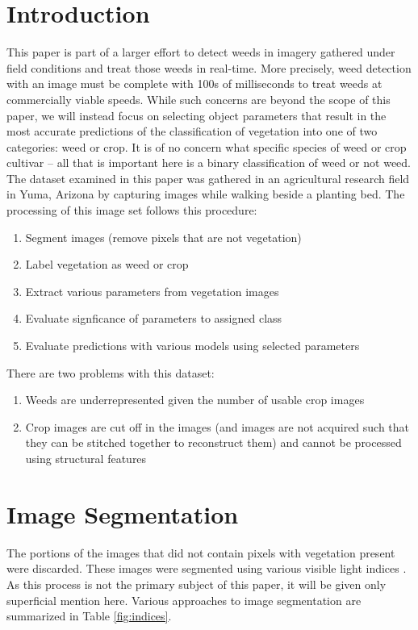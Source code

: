 \documentclass[letterpaper]{article}
\begin{document}
%
%

%
%
\section{Introduction}
This paper is part of a larger effort to detect weeds in imagery gathered under field conditions and treat those weeds in real-time. More precisely, weed detection with an image must be complete with 100s of milliseconds to treat weeds at commercially viable speeds. While such concerns are beyond the scope of this paper, we will instead focus on selecting object parameters that result in the most accurate predictions of the classification of vegetation into one of two categories: weed or crop. It is of no concern what specific species of weed or crop cultivar -- all that is important here is a binary classification of weed or not weed.\\
The dataset examined in this paper was gathered in an agricultural research field in Yuma, Arizona by capturing images while walking beside a planting bed. The processing of this image set follows this procedure:
\begin{enumerate}
	\item{Segment images (remove pixels that are not vegetation)}
	\item{Label vegetation as weed or crop}
	\item{Extract various parameters from  vegetation images}
	\item{Evaluate signficance of parameters to assigned class}
	\item{Evaluate predictions with various models using selected parameters}
\end{enumerate}

There are two problems with this dataset:
\begin{enumerate}
	\item{Weeds are underrepresented given the number of usable crop images}
	\item{Crop images are cut off in the images (and images are not acquired such that they can be stitched together to reconstruct them) and cannot be processed using structural features}
\end{enumerate}

%
%
\section{Image Segmentation}
The portions of the images that did not contain pixels with vegetation present were discarded. These images were segmented using various visible light indices \cite{Wirth2004-li}. As this process is not the primary subject of this paper, it will be given only superficial mention here.  Various approaches to image segmentation are  summarized in Table \ref{fig:indices}.
\end{document}
